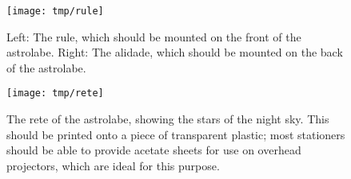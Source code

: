 \documentclass[a4paper,onecolumn,10pt]{article}
\begin{document}
\begin{figure}
\centerline{\texttt{[image: tmp/rule]}}
\caption{Left: The rule, which should be mounted on the front of the astrolabe. Right: The alidade, which should be mounted on the back of the astrolabe.}
\label{rule}
\end{figure}

\begin{figure}
\centerline{\texttt{[image: tmp/rete]}}
\caption{The rete of the astrolabe, showing the stars of the night sky. This should be printed onto a piece of transparent plastic; most stationers should be able to provide acetate sheets for use on overhead projectors, which are ideal for this purpose.}
\label{rete}
\end{figure}
\end{document}
